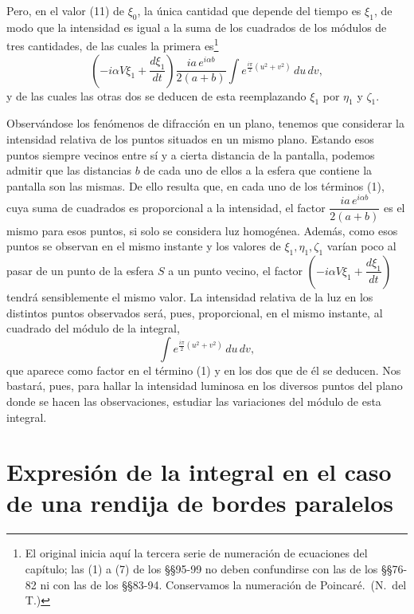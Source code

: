 Pero, en el valor (11) de $\xi_0$, la única cantidad que depende del
tiempo es $\xi_1$, de modo que la intensidad es igual a la suma de los
cuadrados de los módulos de tres cantidades, de las cuales la
primera es\footnote{El original inicia aquí la tercera serie de numeración
de ecuaciones del capítulo; las (1) a (7) de los §§95-99 no
deben confundirse con las de los §§76-82 ni con las de los §§83-94.
Conservamos la numeración de Poincaré.~(N.~del T.)}
\begin{equation}
\left(-i\alpha V\xi_1+\frac{d\xi_1}{dt}\right)
\frac{ia\,e^{i\alpha b}}{2(a+b)}
\int e^{\frac{i\pi}{2}(u^2+v^2)}\,du\,dv,
\tag{1}
\end{equation}
y de las cuales las otras dos se deducen de esta reemplazando $\xi_1$ por
$\eta_1$ y $\zeta_1$.

Observándose los fenómenos de difracción en un plano, tenemos que
considerar la intensidad relativa de los puntos situados en un mismo
plano. Estando esos puntos siempre vecinos entre sí y a cierta distancia
de la pantalla, podemos admitir que las distancias $b$ de cada uno de
ellos a la esfera que contiene la pantalla son las mismas. De ello
resulta que, en cada uno de los términos (1), cuya suma de cuadrados es
proporcional a la intensidad, el factor $\dfrac{ia\,e^{i\alpha b}}{2(a+b)}$
es el mismo para esos puntos, si solo se considera luz homogénea. Además,
como esos puntos se observan en el mismo instante y los valores de
$\xi_1,\eta_1,\zeta_1$ varían poco al pasar de un punto de la esfera $S$ a
un punto vecino, el factor $\left(-i\alpha V\xi_1+\dfrac{d\xi_1}{dt}\right)$
tendrá sensiblemente el mismo valor. La intensidad relativa de la luz en
los distintos puntos observados será, pues, proporcional, en el mismo
instante, al cuadrado del módulo de la integral,
\begin{equation}
\int e^{\frac{i\pi}{2}(u^2+v^2)}\,du\,dv,
\tag{2}
\end{equation}
que aparece como factor en el término (1) y en los dos que de él se
deducen. Nos bastará, pues, para hallar la intensidad luminosa en los
diversos puntos del plano donde se hacen las observaciones, estudiar las
variaciones del módulo de esta integral.

\section{Expresión de la integral en el caso de una rendija de bordes
paralelos}

